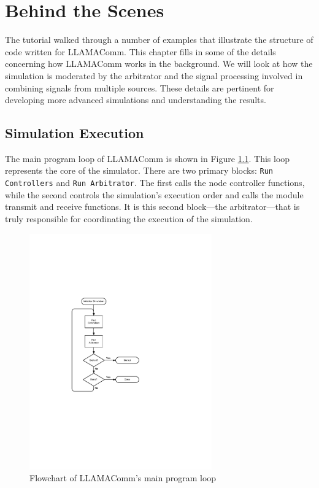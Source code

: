 \chapter{Behind the Scenes}

The tutorial walked through a number of examples that illustrate the
structure of code written for LLAMAComm.  This chapter fills in some
of the details concerning how LLAMAComm works in the background.  We
will look at how the simulation is moderated by the arbitrator and
the signal processing involved in combining signals from multiple
sources.  These details are pertinent for developing more advanced
simulations and understanding the results.

\section{Simulation Execution}\label{sec:simExecution}

The main program loop of LLAMAComm is shown in Figure
\ref{fig:mainLoop}. This loop represents the core of the simulator.
There are two primary blocks: \verb+Run Controllers+ and
\verb+Run Arbitrator+. The first calls the node controller functions, while
the second controls the simulation's execution order and calls the
module transmit and receive functions.  It is this second
block---the arbitrator---that is truly responsible for coordinating
the execution of the simulation.

\begin{figure}[h]
\centering
\includegraphics[height=4in]{figs/Main_Loop_Flowchart}
\caption{Flowchart of LLAMAComm's main program loop}
\label{fig:mainLoop}
\end{figure}


